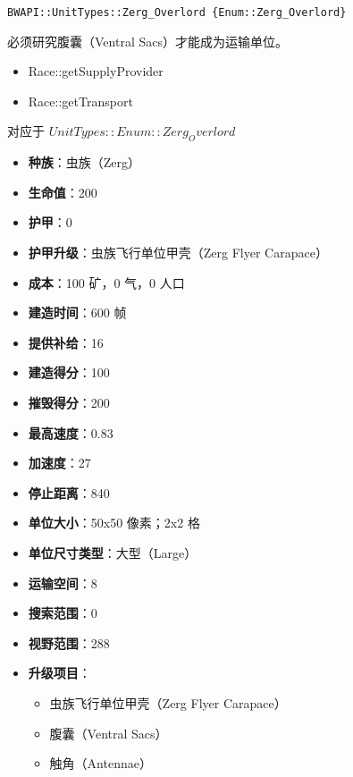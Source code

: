 \begin{tcolorbox}[colback=white, colframe=black!60!white, title=Zerg\_Overlord(), arc=0mm]
    \begin{verbatim}
BWAPI::UnitTypes::Zerg_Overlord {Enum::Zerg_Overlord}
    \end{verbatim}
    必须研究腹囊（Ventral Sacs）才能成为运输单位。
    \begin{refer}
        \begin{itemize}
            \item Race::getSupplyProvider
            \item Race::getTransport
        \end{itemize}
    \end{refer}
    对应于  $ UnitTypes::Enum::Zerg_Overlord $ 
    \begin{itemize}
        \item \textbf{种族}：虫族（Zerg）
        \item \textbf{生命值}：200
        \item \textbf{护甲}：0
        \item \textbf{护甲升级}：虫族飞行单位甲壳（Zerg Flyer Carapace）
        \item \textbf{成本}：100 矿，0 气，0 人口
        \item \textbf{建造时间}：600 帧
        \item \textbf{提供补给}：16
        \item \textbf{建造得分}：100
        \item \textbf{摧毁得分}：200
        \item \textbf{最高速度}：0.83
        \item \textbf{加速度}：27
        \item \textbf{停止距离}：840
        \item \textbf{单位大小}：50x50 像素；2x2 格
        \item \textbf{单位尺寸类型}：大型（Large）
        \item \textbf{运输空间}：8
        \item \textbf{搜索范围}：0
        \item \textbf{视野范围}：288
        \item \textbf{升级项目}：
            \begin{itemize}
                \item 虫族飞行单位甲壳（Zerg Flyer Carapace）
                \item 腹囊（Ventral Sacs）
                \item 触角（Antennae）

\end{itemize}
\end{itemize}
\end{tcolorbox}

